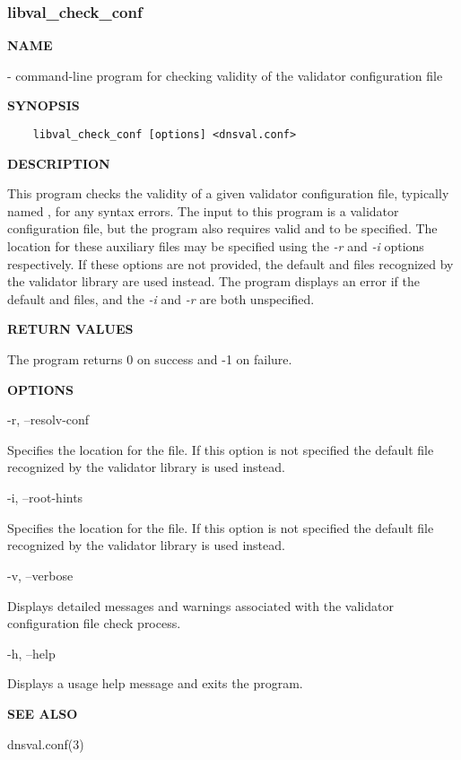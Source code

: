 \clearpage

\subsubsection{libval\_check\_conf}

{\bf NAME}

 - command-line program for checking validity of
the validator configuration file

{\bf SYNOPSIS }

\begin{verbatim}
    libval_check_conf [options] <dnsval.conf>
\end{verbatim}

{\bf DESCRIPTION}

This program checks the validity of a given validator configuration file,
typically named , for any syntax errors.  The input to this
program is a validator configuration file, but the program also requires valid
 and  to be specified.  The location for
these auxiliary files may be specified using the {\it -r} and {\it -i} options
respectively.  If these options are not provided, the default
 and  files recognized by the validator
library are used instead.  The program displays an error if the default
 and  files, and the {\it -i} and {\it -r}
are both unspecified.

{\bf RETURN VALUES}

The program returns 0 on success and -1 on failure.

{\bf OPTIONS}

\begin{description}

\item -r, --resolv-conf\verb" "

Specifies the location for the  file.  If this option is not
specified the default  file recognized by the validator
library is used instead.

\item -i, --root-hints\verb" "

Specifies the location for the  file.  If this option is not
specified the default  file recognized by the validator
library is used instead.

\item -v, --verbose\verb" "

Displays detailed messages and warnings associated with the validator
configuration file check process.

\item -h, --help\verb" "

Displays a usage help message and exits the program.

\end{description}

{\bf SEE ALSO}

dnsval.conf(3)


